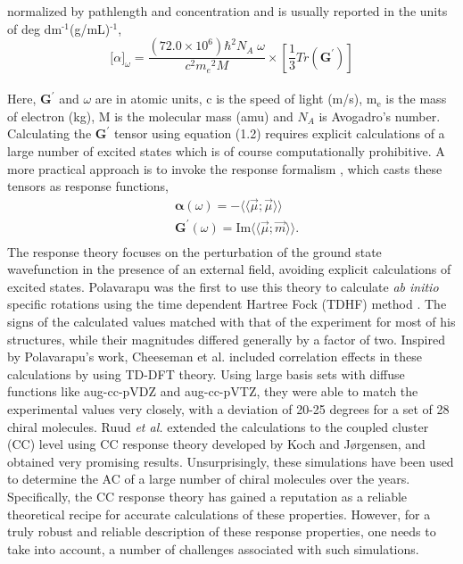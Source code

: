 normalized by pathlength and concentration and is usually reported in the units of deg dm$^{\text{-1}}$(g/mL)$^{\text{-1}}$,\cite{Crawford06}
\\
\begin{equation}
{\lbrack\alpha\rbrack}_{\omega} = \frac{(72.0 \times 10^6){\hbar}^2 N_A\;\omega}{c^2{m_e}^2 M} \times \left[ \frac{1}{3}Tr(\textbf{G}^\prime)\right]
\end{equation}
\\
Here, $\textbf{G}^\prime$ and $\omega$ are in atomic units, c is the speed of light (m/s), m$_{\text{e}}$ is the 
mass of electron (kg), M is the molecular mass (amu) and $N_A$ is Avogadro's number. Calculating the 
$\textbf{G}^\prime$ tensor using equation (1.2) requires explicit calculations of a large number of 
excited states which is of course computationally prohibitive. A more practical approach is to invoke the response formalism
\cite{Kobayashi94,Koch90}, which casts these tensors as response functions,
\begin{equation}
\begin{split}
&\bm{\alpha}(\omega) = -\langle\langle\vec{\mu};\vec{\mu}\rangle\rangle\\
&\textbf{G}^{\prime}(\omega) = \text{Im}\langle\langle\vec{\mu};\vec{m}\rangle\rangle.\\
\end{split}
\end{equation} 
The response theory focuses on the perturbation of the ground state wavefunction in the presence of an external 
field, avoiding explicit calculations of excited states. Polavarapu was the first to use this theory to calculate 
{\em ab initio} specific rotations using the time dependent Hartree Fock (TDHF) method \cite{Polavarapu96}. 
The signs of the calculated values matched with that of the experiment for most of his structures, while their magnitudes 
differed generally by a factor of two. Inspired by Polavarapu's work, Cheeseman et al. \cite{Cheeseman00,Stephens01} 
included correlation effects in these calculations by using TD-DFT theory. Using large basis sets with diffuse functions like 
aug-cc-pVDZ and aug-cc-pVTZ,\cite{Dunning89,Kendall92,Woon94} they were able to match the experimental values very closely, with a 
deviation of 20-25 degrees for a set of 28 chiral molecules. Ruud {\em et al.} extended the calculations to the coupled cluster (CC) level 
using CC response theory developed by Koch and J{\o}rgensen\cite{Koch90}, and obtained very 
promising results\cite{Ruud03}. Unsurprisingly, these simulations have been used to determine the AC of a large number of 
chiral molecules over the years\cite{Kondru99}. Specifically, the CC response theory has gained a reputation as  
a reliable theoretical recipe for accurate calculations of these properties. However, for a truly robust and reliable description of these response 
properties, one needs to take into account, a number of challenges associated with such simulations.
